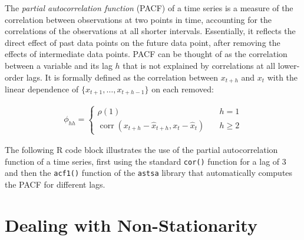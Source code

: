 The \emph{partial autocorrelation function} (PACF) of a time series is a measure of the correlation between observations at two points in time, accounting for the correlations of the observations at all shorter intervals. Essentially, it reflects the direct effect of past data points on the future data point, after removing the effects of intermediate data points. PACF can be thought of as the correlation between a variable and its lag $h$ that is not explained by correlations at all lower-order lags. It is formally defined as the correlation between $x_{t+h}$ and $x_t$ with the linear dependence of $\{x_{t+1}, \ldots, x_{t+h-1}\}$ on each removed:

\begin{align*}
\phi_{hh} = \begin{cases}\rho(1) &\quad h = 1 \\
 \operatorname{corr}(x_{t+h} - \hat{x}_{t+h}, x_t - \hat{x}_t) &\quad h \geq 2
 \end{cases}
\end{align*}

The following R code block illustrates the use of the partial autocorrelation function of a time series, first using the standard \texttt{cor()} function for a lag of $3$ and then the \texttt{acf1()} function of the \texttt{astsa} library that automatically computes the PACF for different lags.

\begin{samepage}
\end{samepage}

\section{Dealing with Non-Stationarity}

